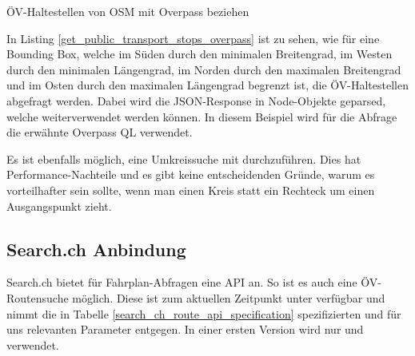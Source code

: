 \begin{listing}[ht]
    \inputminted{python}{projectdoc/listing/get_public_transport_stops_overpass.py}
    \caption{ÖV-Haltestellen von \acs{OSM} mit Overpass beziehen}
    \label{get_public_transport_stops_overpass}
\end{listing}

In Listing \ref{get_public_transport_stops_overpass} ist zu sehen, wie für eine Bounding Box, welche im Süden durch den minimalen Breitengrad, im Westen durch den minimalen Längengrad, im Norden durch den maximalen Breitengrad und im Osten durch den maximalen Längengrad begrenzt ist, die ÖV-Haltestellen abgefragt werden. Dabei wird die JSON-Response in Node-Objekte geparsed, welche weiterverwendet werden können. In diesem Beispiel wird für die Abfrage die erwähnte Overpass QL verwendet.

Es ist ebenfalls möglich, eine Umkreissuche mit  durchzuführen. Dies hat Performance-Nachteile und es gibt keine entscheidenden Gründe, warum es vorteilhafter sein sollte, wenn man einen Kreis statt ein Rechteck um einen Ausgangspunkt zieht.

\subsection{Search.ch Anbindung}
\label{analyse:Search.ch Anbindung}
Search.ch bietet für Fahrplan-Abfragen eine API \cite{search_ch_route_api} an. So ist es auch eine ÖV-Routensuche möglich. Diese ist zum aktuellen Zeitpunkt unter \cite{search_ch_route_api} verfügbar und nimmt die in Tabelle \ref{search_ch_route_api_specification} spezifizierten und für uns relevanten Parameter entgegen. In einer ersten Version wird nur  und  verwendet.

